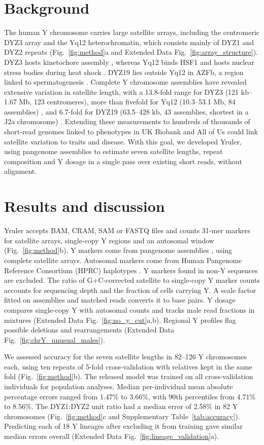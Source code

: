 \section*{Background}
The human Y chromosome carries large satellite arrays, including the centromeric DYZ3 array and the Yq12 heterochromatin, which consists mainly of DYZ1 and DYZ2 repeats (Fig.~\ref{fig:method}a and Extended Data Fig.~\ref{fig:array_structure}). DYZ3 hosts kinetochore assembly \cite{Jain2018}, whereas Yq12 binds HSF1 and hosts nuclear stress bodies during heat shock \cite{Penin2021}. DYZ19 lies outside Yq12 in AZFb, a region linked to spermatogenesis \cite{Vogt2021}. Complete Y chromosome assemblies have revealed extensive variation in satellite length, with a 13.8-fold range for DYZ3 (121 kb--1.67 Mb, 123 centromeres), more than fivefold for Yq12 (10.3--53.1 Mb, 84 assemblies) \cite{Hallast2026}, and 6.7-fold for DYZ19 (63.5--428 kb, 43 assemblies, shortest in a J2a chromosome) \cite{Hallast2023}. Extending these measurements to hundreds of thousands of short-read genomes linked to phenotypes in UK Biobank \cite{UKB2025} and All of Us \cite{AoU2024} could link satellite variation to traits and disease. With this goal, we developed Yruler, using pangenome assemblies to estimate seven satellite lengths, repeat composition and Y dosage in a single pass over existing short reads, without alignment.

\section*{Results and discussion}
Yruler accepts BAM, CRAM, SAM or FASTQ files and counts 31-mer markers for satellite arrays, single-copy Y regions and an autosomal window (Fig.~\ref{fig:method}b). Y markers come from pangenome assemblies \cite{Hallast2026,Lucas2026}, using complete satellite arrays. Autosomal markers come from Human Pangenome Reference Consortium (HPRC) haplotypes \cite{Lucas2026}. Y markers found in non-Y sequences are excluded. The ratio of G+C-corrected satellite to single-copy Y marker counts accounts for sequencing depth and the fraction of cells carrying Y. A scale factor fitted on assemblies and matched reads converts it to base pairs. Y dosage compares single-copy Y with autosomal counts and tracks male read fractions in mixtures (Extended Data Fig.~\ref{fig:no_y_cut}a,b). Regional Y profiles flag possible deletions and rearrangements (Extended Data Fig.~\ref{fig:chrY_unusual_males}).

We assessed accuracy for the seven satellite lengths in 82--126 Y chromosomes each, using ten repeats of 5-fold cross-validation with relatives kept in the same fold (Fig.~\ref{fig:method}b). The released model was trained on all cross-validation individuals for population analyses. Median per-individual mean absolute percentage errors ranged from 1.47\% to 3.66\%, with 90th percentiles from 4.71\% to 8.56\%. The DYZ1:DYZ2 unit ratio had a median error of 2.58\% in 82 Y chromosomes (Fig.~\ref{fig:method}c and Supplementary Table~\ref{tab:accuracy}). Predicting each of 18 Y lineages after excluding it from training gave similar median errors overall (Extended Data Fig.~\ref{fig:lineage_validation}a).

